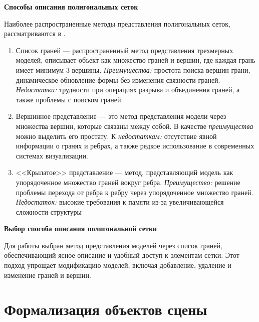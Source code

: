 \textbf{Способы описания полигональных сеток}

Наиболее распространенные методы представления полигональных сеток, рассматриваются в \cite{polygon_mesh}.


\begin{enumerate}
	\item Список граней ---  распространенный метод представления трехмерных моделей, описывает объект как множество граней и вершин, где каждая грань имеет минимум 3 вершины.
	\textit{Преимущества:} простота поиска вершин грани, динамическое обновление формы без изменения связности граней.
	\textit{Недостатки:} трудности при операциях разрыва и объединения граней, а также проблемы с поиском граней.
	
	\item Вершинное представление --- это метод представления модели через множества вершин, которые связаны между собой.
	В качестве \textit{преимущества} можно выделить его простату.
	К \textit{недостаткам:} отсутствие явной информации о гранях и ребрах, а также редкое использование в современных системах визуализации.
	
	\item <<Крылатое>> представление --- метод, представляющий модель как упорядоченное множество граней вокруг ребра.
	\textit{Преимущество:} решение проблемы перехода от ребра к ребру через упорядоченное множество граней.
	\textit{Недостаток:} высокие требования к памяти из-за увеличивающейся сложности структуры
\end{enumerate}


\textbf{Выбор способа описания полигональной сетки} %

Для работы выбран метод представления моделей через список граней, обеспечивающий ясное описание и удобный доступ к элементам сетки.
Этот подход упрощает модификацию моделей, включая добавление, удаление и изменение граней и вершин.




\section{Формализация объектов сцены}

